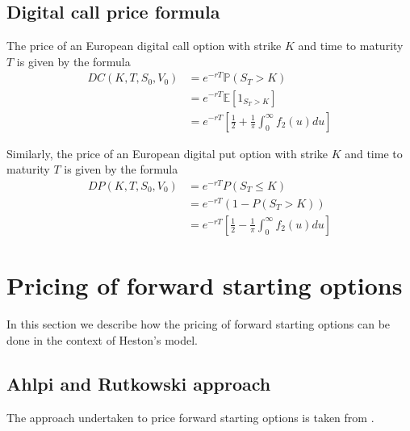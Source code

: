 \subsection{Digital call price formula}
\label{digital}
The price of an European digital call option with strike $K$ and time to maturity $T$ is given by the formula
\begin{equation}
\begin{aligned}
DC(K,T, S_0, V_0) &= e^{-r T} \mathbb{P}(S_T > K) \\ &=  e^{-r T} \mathbb{E}\left[1_{S_T > K}\right] \\
&= e^{-r T}  \left[ \frac{1}{2} + \frac{1}{\pi}\int_0^{\infty}f_2(u) du \right] 
\end{aligned}
\end{equation}

Similarly, the price of an European digital put option with strike $K$ and time to maturity $T$ is given by the formula
\begin{equation}
\begin{aligned}
DP(K,T, S_0, V_0) &= e^{-r T} P(S_T \leq K) \\ 
&= e^{-r T} (1-P(S_T > K))  \\ 
& = e^{-r T}  \left[  \frac{1}{2} - \frac{1}{\pi}\int_0^{\infty}f_2(u) du \right] 
\end{aligned} 
\end{equation}


\section{Pricing of forward starting options}
In this section we describe how the pricing of forward starting options can be done in the context of Heston's model. 

\subsection{Ahlpi and Rutkowski approach}
The approach undertaken to price forward starting options is taken from \cite{ahlip2009forward}.


